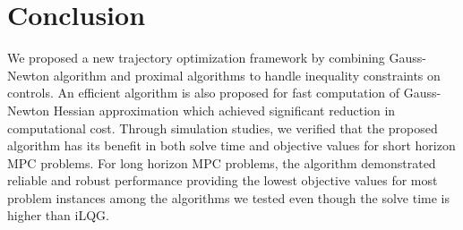 \documentclass[conference]{IEEEtran}
\begin{document}



%

\section{Conclusion}
We proposed a new trajectory optimization framework by combining Gauss-Newton algorithm and proximal algorithms to handle inequality constraints on controls. An efficient algorithm is also proposed for fast computation of Gauss-Newton Hessian approximation which achieved significant reduction in computational cost. Through simulation studies, we verified that the proposed algorithm has its benefit in both solve time and objective values for short  horizon MPC problems. For long horizon MPC problems, the algorithm  demonstrated reliable and robust performance providing the lowest objective values for most problem instances among the algorithms we tested  even though the solve time is higher than iLQG. 



\end{document}
